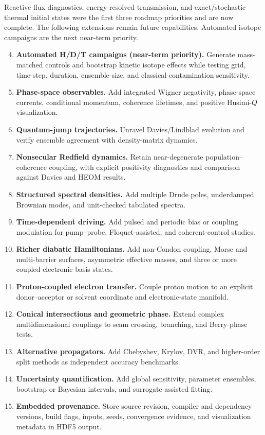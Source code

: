\documentclass[11pt]{article}
\begin{document}
Reactive-flux diagnostics, energy-resolved transmission, and exact/stochastic
thermal initial states were the first three roadmap priorities and are now complete.
The following extensions remain future capabilities. Automated isotope campaigns
are the next near-term priority.

\begin{enumerate}
  \setcounter{enumi}{3}
  \item \textbf{Automated H/D/T campaigns (near-term priority).} Generate
        mass-matched controls and bootstrap kinetic isotope effects while testing
        grid, time-step, duration, ensemble-size, and classical-contamination
        sensitivity.
  \item \textbf{Phase-space observables.} Add integrated Wigner negativity,
        phase-space currents, conditional momentum, coherence lifetimes, and
        positive Husimi-$Q$ visualization.
  \item \textbf{Quantum-jump trajectories.} Unravel Davies/Lindblad evolution
        and verify ensemble agreement with density-matrix dynamics.
  \item \textbf{Nonsecular Redfield dynamics.} Retain near-degenerate
        population--coherence coupling, with explicit positivity diagnostics and
        comparison against Davies and HEOM results.
  \item \textbf{Structured spectral densities.} Add multiple Drude poles,
        underdamped Brownian modes, and unit-checked tabulated spectra.
  \item \textbf{Time-dependent driving.} Add pulsed and periodic bias or coupling
        modulation for pump--probe, Floquet-assisted, and coherent-control studies.
  \item \textbf{Richer diabatic Hamiltonians.} Add non-Condon coupling, Morse and
        multi-barrier surfaces, asymmetric effective masses, and three or more
        coupled electronic basis states.
  \item \textbf{Proton-coupled electron transfer.} Couple proton motion to an
        explicit donor--acceptor or solvent coordinate and electronic-state manifold.
  \item \textbf{Conical intersections and geometric phase.} Extend complex
        multidimensional couplings to seam crossing, branching, and Berry-phase tests.
  \item \textbf{Alternative propagators.} Add Chebyshev, Krylov, DVR, and
        higher-order split methods as independent accuracy benchmarks.
  \item \textbf{Uncertainty quantification.} Add global sensitivity, parameter
        ensembles, bootstrap or Bayesian intervals, and surrogate-assisted fitting.
  \item \textbf{Embedded provenance.} Store source revision, compiler and
        dependency versions, build flags, inputs, seeds, convergence evidence, and
        visualization metadata in HDF5 output.
\end{enumerate}
\end{document}
